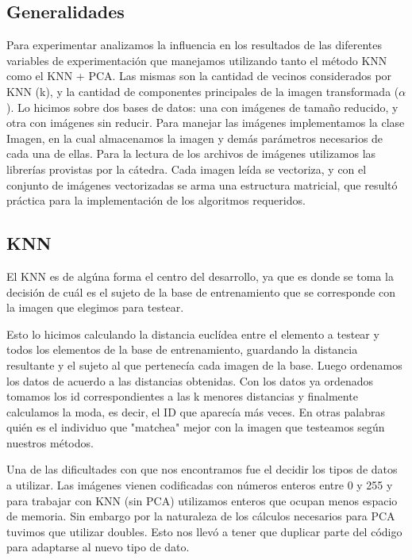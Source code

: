 
\subsection*{Generalidades}

Para experimentar analizamos la influencia en los resultados de las diferentes variables de experimentación que manejamos utilizando tanto el método KNN como el KNN + PCA. 
Las mismas son la cantidad de vecinos considerados por KNN (k), y la cantidad de componentes principales de la imagen transformada ($\alpha$).
Lo hicimos sobre dos bases de datos: una con im\'agenes de tamaño reducido, y otra con imágenes sin reducir.
Para manejar las imágenes implementamos la clase Imagen, en la cual almacenamos la imagen y demás parámetros necesarios de cada una de ellas.
Para la lectura de los archivos de imágenes utilizamos las librerías provistas por la cátedra.
Cada imagen leída se vectoriza, y con el conjunto de imágenes vectorizadas se arma una estructura matricial, que resultó práctica para la implementación de los algoritmos requeridos.

\subsection*{KNN}

El KNN es de algúna forma el centro del desarrollo, ya que es donde se toma la decisión de cuál es el sujeto de la base de entrenamiento que se corresponde con la imagen que elegimos para testear.

Esto lo hicimos calculando la distancia euclídea entre el elemento a testear y todos los elementos de la base de entrenamiento, guardando la distancia resultante y el sujeto al que pertenecía cada imagen de la base. Luego ordenamos los datos de acuerdo a las distancias obtenidas. Con los datos ya ordenados tomamos los id correspondientes a las k menores distancias y finalmente calculamos la moda, es decir, el ID que  aparecía más veces. En otras palabras quién es el individuo que "matchea" mejor con la imagen que testeamos según nuestros métodos. 

\par Una de las dificultades con que nos encontramos fue el decidir los tipos de datos a utilizar. Las imágenes vienen codificadas con números enteros entre 0 y 255 y para trabajar con KNN (sin PCA) utilizamos enteros que ocupan menos espacio de memoria. Sin embargo por la naturaleza de los cálculos necesarios para PCA tuvimos que utilizar doubles. Esto nos llevó a tener que duplicar parte del código para adaptarse al nuevo tipo de dato.


